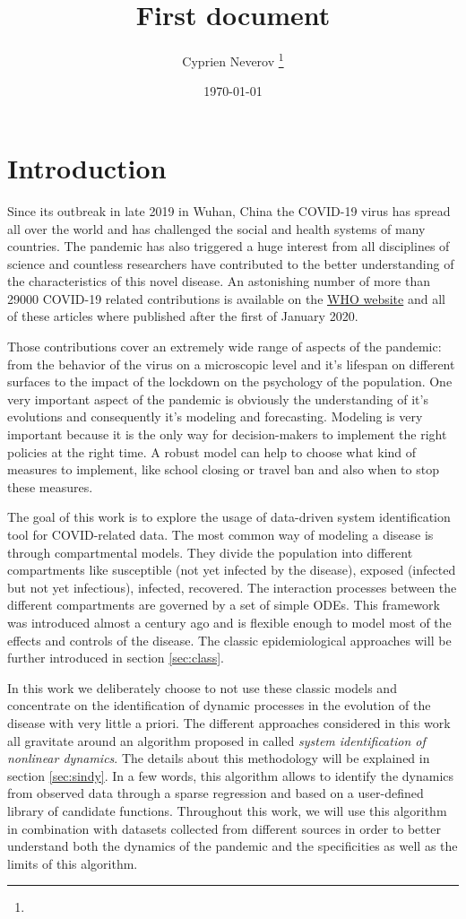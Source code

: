 \documentclass[12pt, letterpaper]{article}
\title{First document}
\author{Cyprien Neverov \thanks{}}
\date{\today}
\begin{document}
\section{Introduction}
Since its outbreak in late 2019 in Wuhan, China the COVID-19 virus has spread all over the world and has challenged the social and health systems of many countries. 
The pandemic has also triggered a huge interest from all disciplines of science and countless researchers have contributed to the better understanding of the characteristics of this novel disease. 
An astonishing number of more than 29000 COVID-19 related contributions is available on the \href{https://search.bvsalud.org/global-literature-on-novel-coronavirus-2019-ncov/}{WHO website} and all of these articles where published after the first of January 2020.

Those contributions cover an extremely wide range of aspects of the pandemic: from the behavior of the virus on a microscopic level and it's lifespan on different surfaces to the impact of the lockdown on the psychology of the population. 
One very important aspect of the pandemic is obviously the understanding of it's evolutions and consequently it's modeling and forecasting. Modeling is very important because it is the only way for decision-makers to implement the right policies at the right time. A robust model can help to choose what kind of measures to implement, like school closing or travel ban and also when to stop these measures.

The goal of this work is to explore the usage of data-driven system identification tool for COVID-related data. 
The most common way of modeling a disease is through compartmental models. They divide the population into different compartments like susceptible (not yet infected by the disease), exposed (infected but not yet infectious), infected, recovered. 
The interaction processes between the different compartments are governed by a set of simple ODEs. 
This framework was introduced almost a century ago and is flexible enough to model most of the effects and controls of the disease. The classic epidemiological approaches will be further introduced in section \ref{sec:class}.

In this work we deliberately choose to not use these  classic models and concentrate on the identification of dynamic processes in the evolution of the disease with very little a priori.
The different approaches considered in this work all gravitate around an algorithm proposed in \cite{sindy} called {\em system identification of nonlinear dynamics}. 
The details about this methodology will be explained in section \ref{sec:sindy}. 
In a few words, this algorithm allows to identify the dynamics from observed data through a sparse regression and based on a user-defined library of candidate functions. 
Throughout this work, we will use this algorithm in combination with datasets collected from different sources in order to better understand both the dynamics of the pandemic and the specificities as well as the limits of this algorithm. 
\end{document}
